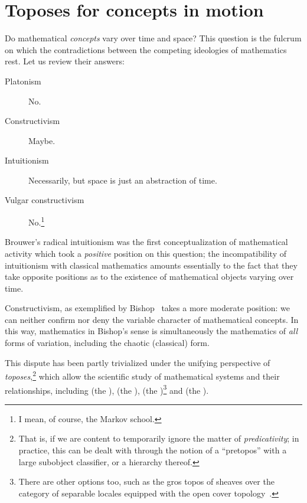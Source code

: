 \documentclass{article}
\begin{document}
\section{Toposes for concepts in motion}

Do mathematical \emph{concepts} vary over time and space? This
question is the fulcrum on which the contradictions between the
competing ideologies of mathematics rest. Let us review their answers:
\begin{description}
\item[Platonism] No.
\item[Constructivism] Maybe.
\item[Intuitionism] Necessarily, but space is just an abstraction of
  time.
\item[Vulgar constructivism] No.\footnote{I mean, of course, the Markov school.}
\end{description}

Brouwer's radical intuitionism was the first conceptualization of
mathematical activity which took a \emph{positive} position on this
question; the incompatibility of intuitionism with classical
mathematics amounts essentially to the fact that they take opposite
positions as to the existence of mathematical objects varying over
time.

Constructivism, as exemplified by Bishop~\cite{bishop:1967} takes a
more moderate position: we can neither confirm nor deny the variable
character of mathematical concepts. In this way, mathematics in
Bishop's sense is simultaneously the mathematics of \emph{all} forms
of variation, including the chaotic (classical) form.

This dispute has been partly trivialized under the unifying
perspective of \emph{toposes},\footnote{That is, if we are content to
  temporarily ignore the matter of \emph{predicativity}; in practice,
  this can be dealt with through the notion of a ``pretopos'' with a
  large subobject classifier, or a hierarchy thereof.}  which allow
the scientific study of mathematical systems and their relationships,
including  (the ),
 (the ),
 (the )\footnote{There are other options too, such as
  the gros topos of sheaves over the category of separable locales
  equipped with the open cover
  topology~\cite{fourman:1984,fourman:2013}.} and  (the ).
\end{document}
